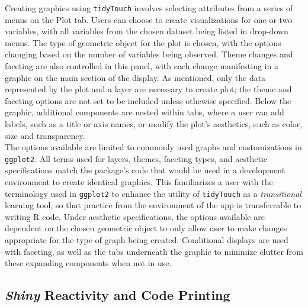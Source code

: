 \documentclass[english,man,floatsintext]{apa6}
\begin{document}
Creating graphics using \texttt{tidyTouch} involves selecting attributes from a series of menus on the Plot tab. Users can choose to create visualizations for one or two variables, with all variables from the chosen dataset being listed in drop-down menus. The type of geometric object for the plot is chosen, with the options changing based on the number of variables being observed. Theme changes and faceting are also controlled in this panel, with each change manifesting in a graphic on the main section of the display. As mentioned, only the data represented by the plot and a layer are necessary to create plot; the theme and faceting options are not set to be included unless othewise specified. Below the graphic, additional components are nested within tabs, where a user can add labels, such as a title or axis names, or modify the plot's aesthetics, such as color, size and transparency.\\
The options available are limited to commonly used graphs and customizations in \texttt{ggplot2}. All terms used for layers, themes, faceting types, and aesthetic specifications match the package's code that would be used in a development environment to create identical graphics. This familiarizes a user with the terminology used in \texttt{ggplot2} to enhance the utility of \texttt{tidyTouch} as a \emph{transitional} learning tool, so that practice from the environment of the app is transferrable to writing R code. Under aesthetic specifications, the options available are dependent on the chosen geometric object to only allow user to make changes appropriate for the type of graph being created. Conditional displays are used with faceting, as well as the tabs underneath the graphic to minimize clutter from these expanding components when not in use.

\hypertarget{shiny-reactivity-and-code-printing}{%
\subsection{\texorpdfstring{\emph{Shiny} Reactivity and Code Printing}{Shiny Reactivity and Code Printing}}\label{shiny-reactivity-and-code-printing}}
\end{document}
